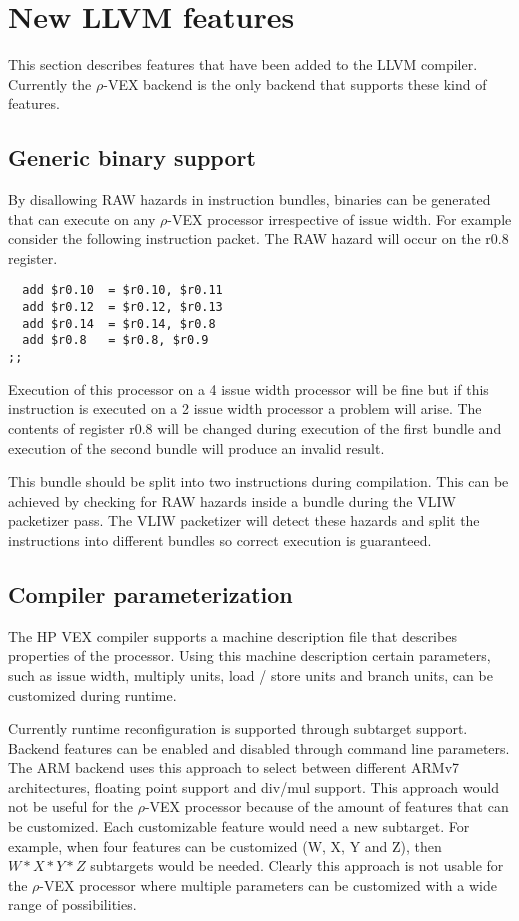 \section{New LLVM features}
This section describes features that have been added to the LLVM compiler. Currently the $\rho$-VEX backend is the only backend that supports these kind of features.

\subsection{Generic binary support}
By disallowing RAW hazards in instruction bundles, binaries can be generated that can execute on any $\rho$-VEX processor irrespective of issue width. For example consider the following instruction packet. The RAW hazard will occur on the r0.8 register.

\begin{lstlisting}
  add $r0.10  = $r0.10, $r0.11
  add $r0.12  = $r0.12, $r0.13
  add $r0.14  = $r0.14, $r0.8
  add $r0.8   = $r0.8, $r0.9
;; 
\end{lstlisting}

Execution of this processor on a 4 issue width processor will be fine but if this instruction is executed on a 2 issue width processor a problem will arise. The contents of register r0.8 will be changed during execution of the first bundle and execution of the second bundle will produce an invalid result.

This bundle should be split into two instructions during compilation. This can be achieved by checking for RAW hazards inside a bundle during the VLIW packetizer pass. The VLIW packetizer will detect these hazards and split the instructions into different bundles so correct execution is guaranteed.

\subsection{Compiler parameterization}
The HP VEX compiler supports a machine description file that describes properties of the processor. Using this machine description certain parameters, such as issue width, multiply units, load / store units and branch units, can be customized during runtime. 

Currently runtime reconfiguration is supported through subtarget support. Backend features can be enabled and disabled through command line parameters. The ARM backend uses this approach to select between different ARMv7 architectures, floating point support and div/mul support. This approach would not be useful for the $\rho$-VEX processor because of the amount of features that can be customized. Each customizable feature would need a new subtarget. For example, when four features can be customized (W, X, Y and Z), then $W*X*Y*Z$ subtargets would be needed. Clearly this approach is not usable for the $\rho$-VEX processor where multiple parameters can be customized with a wide range of possibilities.

